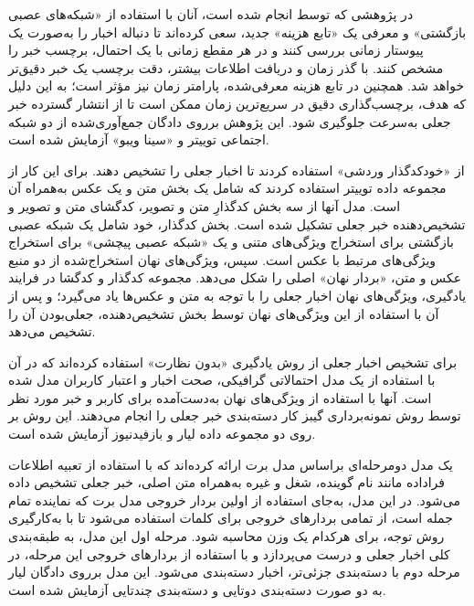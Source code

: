 در پژوهشی که توسط \citet{ramezani2019news} انجام شده ‌است، آنان با استفاده از «شبکه‌های عصبی بازگشتی» و معرفی یک «تابع هزینه» جدید، سعی کرده‌اند تا دنباله اخبار را به‌صورت یک پیوستار زمانی بررسی کنند و در هر مقطع زمانی با یک احتمال، برچسب خبر را مشخص کنند. با گذر زمان و دریافت اطلاعات بیشتر، دقت برچسب یک خبر دقیق‌تر خواهد شد. همچنین در تابع هزینه معرفی‌شده، پارامتر زمان نیز مؤثر است؛ به این دلیل که هدف، برچسب‌گذاری دقیق در سریع‌ترین زمان ممکن است تا از انتشار گسترده خبر جعلی به‌سرعت جلوگیری شود. این پژوهش برروی دادگان جمع‌آوری‌شده از دو شبکه اجتماعی توییتر و «سینا ویبو» آزمایش شده ‌است.

\citet{khattar2019mvae}   از  «خودکدگذار وردشی» استفاده کردند تا اخبار جعلی را تشخیص دهند. برای این کار از مجموعه داده توییتر استفاده کردند که شامل یک بخش متن و یک عکس به‌همراه آن است. مدل آنها از سه بخش کدگذارِ متن و تصویر، کدگشای متن و تصویر و تشخیص‌دهنده خبر جعلی تشکیل شده‌ است. بخش کدگذار، خود شامل یک شبکه عصبی بازگشتی برای استخراج ویژگی‌های متنی و یک «شبکه عصبی پیچشی» برای استخراج ویژگی‌های مرتبط با عکس است. سپس، ویژگی‌های نهان استخراج‌شده از دو منبع عکس و متن، «بردار نهان» اصلی را شکل می‌دهد. مجموعه کدگذار و کدگشا در فرایند یادگیری، ویژگی‌های نهان اخبار جعلی را با توجه به متن و عکس‌ها یاد می‌گیرد؛ و پس از آن با استفاده از این ویژگی‌های نهان توسط بخش تشخیص‌دهنده، جعلی‌بودن آن را تشخیص می‌دهد.  %

\citet{yang2019unsupervised} برای تشخیص اخبار جعلی از روش یادگیری «بدون نظارت» استفاده کرده‌اند که در آن با استفاده از  یک مدل احتمالاتی گرافیکی، صحت اخبار و اعتبار کاربران مدل شده‌ است. آنها با استفاده از ویژگی‌های نهان به‌دست‌آمده برای  کاربر و خبر مورد نظر توسط روش نمونه‌برداری گیبز کار دسته‌بندی خبر جعلی را انجام می‌دهند. این روش بر روی دو مجموعه داده لیار  \citep{wang2017liar}  و بازفیدنیوز آزمایش شده‌ است. %

\citet{liu2019two} یک مدل دومرحله‌ای براساس مدل برت ارائه کرده‌اند که با استفاده از تعبیه اطلاعات فراداده مانند نام
 گوینده، شغل و غیره به‌همراه متن اصلی، خبر جعلی تشخیص داده می‌شود. در این مدل، به‌جای استفاده از اولین بردار خروجی مدل برت که نماینده تمام جمله است، از تمامی بردارهای خروجی برای کلمات استفاده می‌شود تا با به‌کارگیری روش توجه، برای
 هرکدام یک وزن محاسبه شود. مرحله اول این مدل، به طبقه‌بندی کلی اخبار جعلی و درست می‌پردازد و با استفاده از بردارهای خروجی این مرحله، در مرحله دوم با دسته‌بندی جزئی‌تر، اخبار دسته‌بندی می‌شود. این مدل برروی دادگان لیار به دو صورت دسته‌بندی دوتایی و دسته‌بندی چندتایی آزمایش شده است.%

